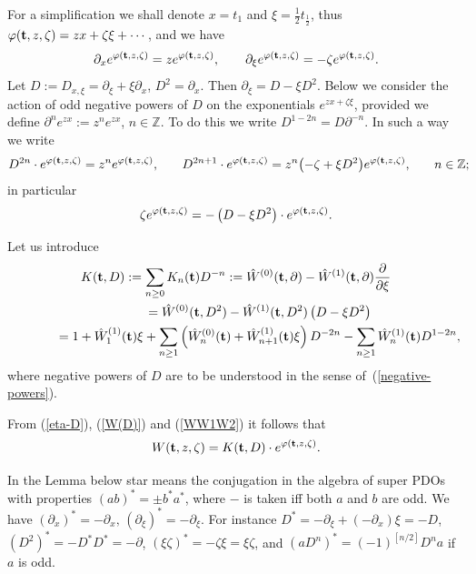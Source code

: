 \documentclass[pdftex]{sigma}
\numberwithin{equation}{section}
\newcommand{\Z}{\mathbb{Z}}
\begin{document}
For a simplif\/ication we shall denote $x=t_1$ and $\xi=\frac 12
t_{\frac 12}$, thus $\varphi({\bf t},z,\zeta)=zx+\zeta\xi+\cdots$,
and we have
 \[
\partial_x e^{\varphi({\bf t},z,\zeta)} = z e^{\varphi({\bf
t},z,\zeta)} ,\qquad \partial_{\xi} e^{\varphi({\bf
t},z,\zeta)} = - \zeta e^{\varphi({\bf t},z,\zeta)} .
 \]
   Let
 $D := D_{x,\xi}=\partial_\xi+\xi\partial_x$, $D^2=\partial_x$. Then $\partial_\xi
 =D-\xi D^2$. Below we consider the action of odd negative powers of $D$ on
the exponentials $e^{zx+\zeta\xi}$, provided we def\/ine $\partial^n
e^{zx}:=z^ne^{zx}$, $n\in\Z$. To do this we write
$D^{1-2n}=D\partial^{-n}$.
 In such a way we write
  \begin{gather}
D^{2n}\cdot e^{\varphi({\bf t},z,\zeta)} = z^n e^{\varphi({\bf
t},z,\zeta)}, \!\qquad D^{2n+1}\cdot e^{\varphi({\bf
t},z,\zeta)} = z^n\big({-}\zeta + \xi D^2\big) e^{\varphi({\bf
t},z,\zeta)},\!\qquad n\in\Z ;\label{negative-powers}\!\!\!
  \end{gather}
  in particular
  \begin{gather}\label{eta-D}
\zeta  e^{\varphi({\bf t},z,\zeta)}=-\left(D-\xi D^2 \right)\cdot
e^{\varphi({\bf t},z,\zeta)} .
  \end{gather}

Let us introduce
\begin{gather}
K({\bf t},D):=\sum_{n\ge 0} K_n({\bf t}) D^{-n}
:= {\hat W}^{(0)}({\bf t},\partial) - {\hat W}^{(1)}({\bf
 t},\partial)\frac{\partial}{\partial \xi}\nonumber\\
\hphantom{K({\bf t},D)}{} = {\hat W}^{(0)}({\bf t},D^2) - {\hat W}^{(1)}({\bf
 t},D^2)\left(D-\xi D^2 \right)\nonumber\\
\hphantom{K({\bf t},D)}{}
= 1+  {\hat W}_{1}^{(1)}({\bf
 t}) \xi
  +\sum_{n\ge
1}\left({\hat W}_{n}^{(0)}({\bf t})+ {\hat W}_{n+1}^{(1)}({\bf
t})\xi \right)D^{-2n} -\sum_{n \ge 1}{\hat W}_{n}^{(1)}({\bf
t})D^{1-2n} ,\label{W(D)}
\end{gather}
 where negative powers of $D$ are to be understood in the sense of~(\ref{negative-powers}).

From  (\ref{eta-D}), (\ref{W(D)}) and (\ref{WW1W2}) it follows that
\[
 W({\bf t},z,\zeta) =
  K({\bf t},D)\cdot e^{\varphi({\bf t},z,\zeta)} .
\]

In the Lemma below star means the conjugation in the algebra of super PDOs
with properties $(ab)^*=\pm b^*a^*$, where $-$ is
taken if\/f both $a$ and $b$ are odd. We have
$(\partial_x)^*=-\partial_x,\, (\partial_\xi)^*=-\partial_\xi$.
For instance $D^*=-\partial_\xi+(-\partial_x)\xi=-D$,
$\left(D^2\right)^*=-D^*D^*=-\partial$,
$(\xi\zeta)^*=-\zeta\xi=\xi\zeta$, and $(a
D^n)^*=(-1)^{\left[n/2\right]} D^n a$ if $a$ is odd.
\end{document}
